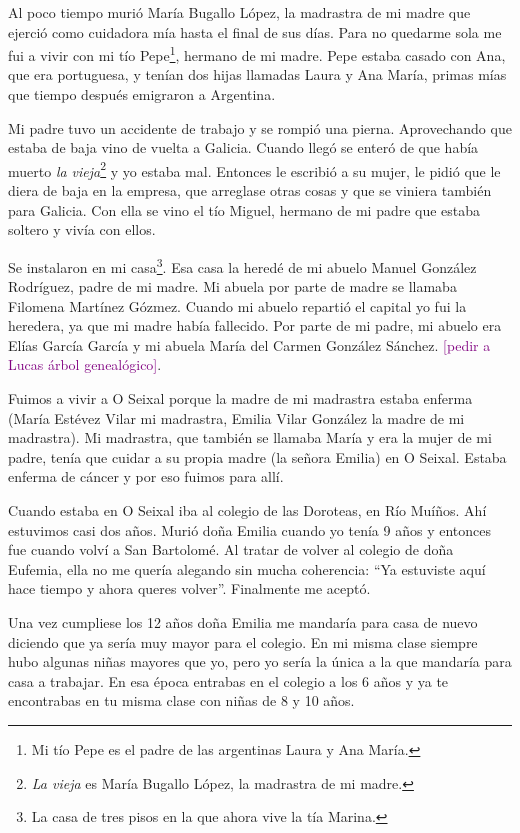 \documentclass[12pt,a5paper]{book}
\begin{document}
Al poco tiempo murió María Bugallo López, la madrastra de mi madre que ejerció como cuidadora mía hasta el final de sus días. Para no quedarme sola me fui a vivir con mi tío Pepe\footnote{Mi tío Pepe es el padre de las argentinas Laura y Ana María.}, hermano de mi madre. Pepe estaba casado con Ana, que era portuguesa, y tenían dos hijas llamadas Laura y Ana María, primas mías que tiempo después emigraron a Argentina. 

Mi padre tuvo un accidente de trabajo y se rompió una pierna. Aprovechando que estaba de baja vino de vuelta a Galicia. Cuando llegó se enteró de que había muerto \textit{la vieja}\footnote{\textit{La vieja} es María Bugallo López, la madrastra de mi madre.} y yo estaba mal. Entonces le escribió a su mujer, le pidió que le diera de baja en la empresa, que arreglase otras cosas y que se viniera también para Galicia. Con ella se vino el tío Miguel, hermano de mi padre que estaba soltero y vivía con ellos.

Se instalaron en mi casa\footnote{La casa de tres pisos en la que ahora vive la tía Marina.}. Esa casa la heredé de mi abuelo Manuel González Rodríguez, padre de mi madre. Mi abuela por parte de madre se llamaba Filomena Martínez Gózmez. Cuando mi abuelo repartió el capital yo fui la heredera, ya que mi madre había fallecido. Por parte de mi padre, mi abuelo era Elías García García y mi abuela María del Carmen González Sánchez. \textcolor{purple}{[pedir a Lucas árbol genealógico]}.

Fuimos a vivir a O Seixal porque la madre de mi madrastra estaba enferma (María Estévez Vilar mi madrastra, Emilia Vilar González la madre de mi madrastra). Mi madrastra, que también se llamaba María y era la mujer de mi padre, tenía que cuidar a su propia madre (la señora Emilia) en O Seixal. Estaba enferma de cáncer y por eso fuimos para allí.

Cuando estaba en O Seixal iba al colegio de las Doroteas, en Río Muíños. Ahí estuvimos casi dos años. Murió doña Emilia cuando yo tenía 9 años y entonces fue cuando volví a San Bartolomé. Al tratar de volver al colegio de doña Eufemia, ella no me quería alegando sin mucha coherencia: ``Ya estuviste aquí hace tiempo y ahora queres volver''. Finalmente me aceptó.

Una vez cumpliese los 12 años doña Emilia me mandaría para casa de nuevo diciendo que ya sería muy mayor para el colegio. En mi misma clase siempre hubo algunas niñas mayores que yo, pero yo sería la única a la que mandaría para casa a trabajar. En esa época entrabas en el colegio a los 6 años y ya te encontrabas en tu misma clase con niñas de 8 y 10 años.
\end{document}
